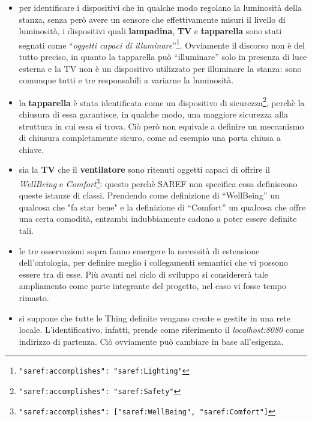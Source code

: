 \documentclass[12pt,a4paper,openright,oneside]{report}
\newcommand{\quotes}[1]{``#1''}
\begin{document}
\begin{itemize}
	\item per identificare i dispositivi che in qualche modo regolano la luminosità della stanza, senza però avere un sensore che effettivamente misuri il livello di luminosità, i dispositivi quali \textbf{lampadina}, \textbf{TV} e \textbf{tapparella} sono stati segnati come \quotes{\textit{oggetti capaci di illuminare}}\footnote{\texttt{"saref:accomplishes": "saref:Lighting"}}. Ovviamente il discorso non è del tutto preciso, in quanto la tapparella può \quotes{illuminare} solo in presenza di luce esterna e la TV non è un dispositivo utilizzato per illuminare la stanza: sono comunque tutti e tre responsabili a variarne la luminosità.
	
	\item la \textbf{tapparella} è stata identificata come un dispositivo di sicurezza\footnote{\texttt{"saref:accomplishes": "saref:Safety"}}, perchè la chiusura di essa garantisce, in qualche modo, una maggiore sicurezza alla struttura in cui essa si trova. Ciò però non equivale a definire un meccanismo di chiusura completamente sicuro, come ad esempio una porta chiusa a chiave. 
	
	\item sia la \textbf{TV} che il \textbf{ventilatore} sono ritenuti oggetti capaci di offrire il \textit{WellBeing} e \textit{Comfort}\footnote{\texttt{"saref:accomplishes": ["saref:WellBeing", "saref:Comfort"]}}: questo perchè SAREF non specifica cosa definiscono queste istanze di classi. Prendendo come definizione di \quotes{WellBeing} un qualcosa che "fa star bene" e la definizione di \quotes{Comfort} un qualcosa che offre una certa comodità, entrambi indubbiamente cadono a poter essere definite tali.
	
	\item le tre osservazioni sopra fanno emergere la necessità di estensione dell'ontologia, per definire meglio i collegamenti semantici che vi possono essere tra di esse. Più avanti nel ciclo di sviluppo si considererà tale ampliamento come parte integrante del progetto, nel caso vi fosse tempo rimasto.
	
	\item si suppone che tutte le Thing definite vengano create e gestite in una rete locale. L'identificativo, infatti, prende come riferimento il \textit{localhost:8080} come indirizzo di partenza. Ciò ovviamente può cambiare in base all'esigenza.
\end{itemize}
\end{document}
